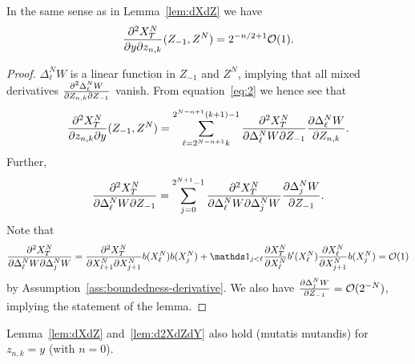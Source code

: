\begin{lemma}
  \label{lem:d2XdZdY}
  In the same sense as in Lemma~\ref{lem:dXdZ} we have
  \begin{equation*}
    \frac{\partial^2 X^N_T}{\partial y \partial z_{n,k}}(Z_{-1}, Z^N) = 2^{-n/2+1} \mathcal{O}(1).
  \end{equation*}
\end{lemma}
\begin{proof}
  $\Delta^N_\ell W$ is a linear function in $Z_{-1}$ and $Z^N$, implying that
  all mixed derivatives $\frac{\partial^2\Delta^N_\ell W}{\partial Z_{n,k} \partial Z_{-1}}$ vanish.
  From equation~\eqref{eq:2} we hence see that
  \begin{equation*}
    \frac{\partial^2 X^N_T}{\partial z_{n,k} \partial y}(Z_{-1}, Z^N) =
    \sum_{\ell=2^{N-n+1}k}^{2^{N-n+1}(k+1)-1} \frac{\partial^2 X^N_T}{\partial \Delta^N_\ell
      W \partial Z_{-1}} \frac{\partial \Delta^N_\ell W}{\partial Z_{n,k} }.
  \end{equation*}
  Further,
  \begin{equation*}
    \frac{\partial^2 X^N_T}{\partial \Delta^N_\ell W \partial Z_{-1}} = \sum_{j=0}^{2^{N+1}-1}
    \frac{\partial^2 X^N_T}{\partial \Delta^N_\ell W \partial \Delta^N_j W} \frac{\partial \Delta^N_j W}{\partial
      Z_{-1}}.
  \end{equation*}
  Note that
  \begin{equation}
    \label{eq:d2XdWdW}
    \f{\pa^2 X^N_T}{\pa \Delta^N_\ell W \pa \Delta^N_j W} = \f{\pa^2
      X^N_T}{\pa X^N_{\ell+1} \pa X^N_{j+1}} b(X^N_\ell) b(X^N_j) + \indic{j
      < \ell} \f{\pa X^N_T}{\pa X_\ell^N} b^\prime(X^N_\ell) \f{\pa
      X^N_\ell}{\pa X^N_{j+1}} b(X^N_j) = \mathcal{O}(1)
  \end{equation}
  by Assumption~\ref{ass:boundedness-derivative}. We also have $\frac{\partial \Delta^N_j W}{\partial
    Z_{-1}} = \mathcal{O}(2^{-N})$, implying the statement of the lemma.
\end{proof}

\begin{remark}
  Lemma~\ref{lem:dXdZ} and~\ref{lem:d2XdZdY} also hold (mutatis mutandis) for
  $z_{n,k} = y$ (with $n = 0$).  
\end{remark}

